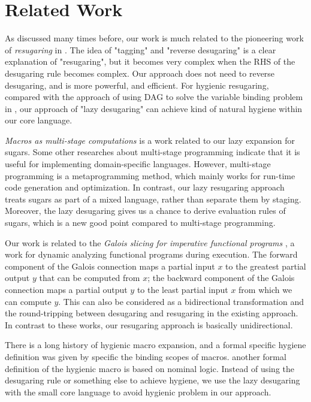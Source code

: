 \section{Related Work}
\label{sec6}

As discussed many times before, our work is much related to the pioneering work of \emph{resugaring} in \cite{resugaring}. The idea of "tagging" and "reverse desugaring" is a clear explanation of "resugaring", but it becomes very complex when the RHS of the desugaring rule becomes complex. Our approach does not need to reverse desugaring, and is more powerful, and efficient.
For hygienic resugaring, compared with the approach of using DAG to solve the variable binding  problem in \cite{hygienic}, our approach of "lazy desugaring" can achieve kind of natural hygiene within our core language.



\emph{Macros as multi-stage computations} \cite{multistage} is a work related to our lazy expansion for sugars. Some other researches \cite{modularstaging} about multi-stage programming \cite{MSP} indicate that it is useful for implementing domain-specific languages. However, multi-stage programming is a metaprogramming method, which mainly works for run-time code generation and optimization. In contrast, our lazy resugaring approach treats sugars as part of a mixed language, rather than separate them by staging. Moreover, the lazy desugaring gives us a chance to derive evaluation rules of sugars, which is a new good point compared to multi-stage programming.

Our work is related to the \emph{Galois slicing for imperative functional programs} \cite{slicing}, a work for dynamic analyzing functional programs during execution. The forward component of the Galois connection maps a partial input $x$ to the greatest partial output $y$ that can be computed from $x$; the backward component of the Galois connection maps a partial output $y$ to the least partial input $x$ from which we can compute $y$.
This can also be considered as a bidirectional transformation \cite{bx,lens07} and the round-tripping between desugaring and resugaring in the existing approach. In contrast to these works, our resugaring approach is basically unidirectional. 


There is a long history of hygienic macro expansion\cite{hygienicmacro}, and a formal specific hygiene definition was given \cite{10.5555/1792878.1792884} by specific the binding scopes of macros. another formal definition of the hygienic macro\cite{EssenceofHygiene} is based on nominal logic\cite{10.1007/s001650200016}. Instead of using the desugaring rule or something else to achieve hygiene, we use the lazy desugaring with the small core language to avoid hygienic problem in our approach.
%

